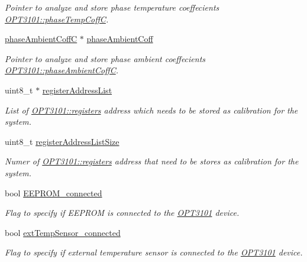 \begin{DoxyCompactItemize}
\begin{DoxyCompactList}\small\item\em Pointer to analyze and store phase temperature coeffecients \mbox{\hyperlink{class_o_p_t3101_1_1phase_temp_coff_c}{O\+P\+T3101\+::phase\+Temp\+CoffC}}. \end{DoxyCompactList}\item 
\mbox{\hyperlink{class_o_p_t3101_1_1phase_ambient_coff_c}{phase\+Ambient\+CoffC}} $\ast$ \mbox{\hyperlink{class_o_p_t3101_1_1calibration_a6b2447d419a5f3544b648aaa618288a9}{phase\+Ambient\+Coff}}
\begin{DoxyCompactList}\small\item\em Pointer to analyze and store phase ambient coeffecients \mbox{\hyperlink{class_o_p_t3101_1_1phase_ambient_coff_c}{O\+P\+T3101\+::phase\+Ambient\+CoffC}}. \end{DoxyCompactList}\item 
uint8\+\_\+t $\ast$ \mbox{\hyperlink{class_o_p_t3101_1_1calibration_a590e645bfaf87fa8145f80b35dfa3b44}{register\+Address\+List}}
\begin{DoxyCompactList}\small\item\em List of \mbox{\hyperlink{class_o_p_t3101_1_1registers}{O\+P\+T3101\+::registers}} address which needs to be stored as calibration for the system. \end{DoxyCompactList}\item 
uint8\+\_\+t \mbox{\hyperlink{class_o_p_t3101_1_1calibration_af17ddf5a6cc9919a1bfebde92e0d314f}{register\+Address\+List\+Size}}
\begin{DoxyCompactList}\small\item\em Numer of \mbox{\hyperlink{class_o_p_t3101_1_1registers}{O\+P\+T3101\+::registers}} address that need to be stores as calibration for the system. \end{DoxyCompactList}\item 
bool \mbox{\hyperlink{class_o_p_t3101_1_1calibration_a5a8e3d0fc96ea3319d10585cb073da35}{E\+E\+P\+R\+O\+M\+\_\+connected}}
\begin{DoxyCompactList}\small\item\em Flag to specify if E\+E\+P\+R\+OM is connected to the \mbox{\hyperlink{namespace_o_p_t3101}{O\+P\+T3101}} device. \end{DoxyCompactList}\item 
bool \mbox{\hyperlink{class_o_p_t3101_1_1calibration_a937b08e4daf706842ae8e64eed4065bc}{ext\+Temp\+Sensor\+\_\+connected}}
\begin{DoxyCompactList}\small\item\em Flag to specify if external temperature sensor is connected to the \mbox{\hyperlink{namespace_o_p_t3101}{O\+P\+T3101}} device. \end{DoxyCompactList}\end{DoxyCompactItemize}


